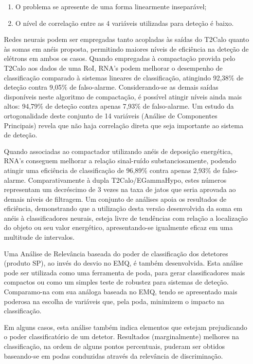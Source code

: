 \begin{enumerate}
\item O problema se apresente de uma forma linearmente inseparável;
\item O nível de correlação entre as 4 variáveis utilizadas para deteção é
baixo.
\end{enumerate}

Redes neurais podem ser empregadas tanto acopladas às saídas do T2Calo quanto
às somas em anéis proposta, permitindo maiores níveis de eficiência na deteção
de elétrons em ambos os casos. Quando empregadas à compactação provida pelo
T2Calo aos dados de uma RoI, RNA's podem melhorar o desempenho de
classificação comparado à sistemas lineares de classificação, atingindo
92,38\% de deteção contra 9,05\% de falso-alarme. Considerando-se as demais
saídas disponíveis neste algoritmo de compactação, é possível atingir níveis
ainda mais altos: 94,79\% de deteção contra apenas 7,93\% de falso-alarme. Um
estudo da ortogonalidade deste conjunto de 14 variáveis (Análise de
Componentes Principais) revela que não haja correlação direta que seja
importante ao sistema de deteção.

Quando associadas ao compactador utilizando anéis de deposição energética,
RNA's conseguem melhorar a relação sinal-ruído substanciosamente, podendo
atingir uma eficiência de classificação de 96,89\% contra apenas 2,93\% de
falso-alarme. Comparativamente à dupla T2Calo/EGammaHypo, estes números
representam um decréscimo de 3 vezes na taxa de jatos que seria aprovada ao
demais níveis de filtragem. Um conjunto de análises apoia os resultados de
eficiência, demonstrando que a utilização desta versão desenvolvida da soma em
anéis à classificadores neurais, esteja livre de tendências com relação a
localização do objeto ou seu valor energético, apresentando-se igualmente
eficaz em uma multitude de intervalos.

Uma Análise de Relevância baseada do poder de classificação dos detetores
(produto SP), ao invés do desvio no EMQ, é também desenvolvida. Esta análise
pode ser utilizada como uma ferramenta de poda, para gerar classificadores
mais compactos ou como um simples teste de robustez para sistemas de
deteção. Comparamo-na com sua análoga baseada no EMQ, tendo se apresentado
mais poderosa na escolha de variáveis que, pela poda, minimizem o impacto na
classificação.

Em alguns casos, esta análise também indica elementos que estejam prejudicando
o poder classificatório de um detetor. Resultados (marginalmente) melhores na
classificação, na ordem de alguns pontos percentuais, puderam ser obtidos
baseando-se em podas conduzidas através da relevância de discriminação.

